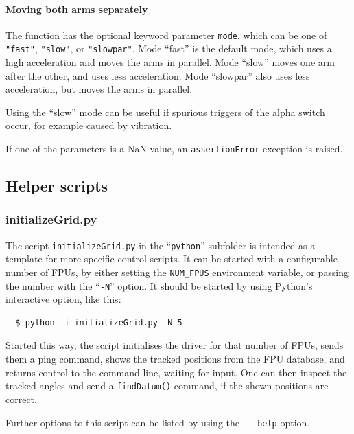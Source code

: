 \documentclass[11pt,a4paper]{scrartcl}
\begin{document}
\paragraph{Moving both arms separately}

The function has the optional keyword parameter \texttt{mode}, which
can be one of \texttt{"fast"}, \texttt{"slow"}, or \texttt{"slowpar"}.
Mode ``fast'' is the default mode, which uses a high acceleration and
moves the arms in parallel. Mode ``slow'' moves one arm after the
other, and uses less acceleration. Mode ``slowpar'' also uses less
acceleration, but moves the arms in parallel.

Using the ``slow'' mode can be useful if spurious triggers of the
alpha switch occur, for example caused by vibration.

If one of the parameters is a NaN value, an \texttt{assertionError}
exception is raised.

\subsection{Helper scripts}

\subsubsection{initializeGrid.py}
\label{sec:initializegrid}

The script \texttt{initializeGrid.py} in the ``\texttt{python}''
subfolder is intended as a template for more specific control scripts.
It can be started with a configurable number of FPUs, by either
setting the \texttt{NUM\_FPUS} environment variable, or passing the
number with the ``\texttt{-N}'' option. It should be started by using
Python's interactive option, like this:

\begin{verbatim}
  $ python -i initializeGrid.py -N 5
\end{verbatim}

Started this way, the script initialises the driver for that number of
FPUs, sends them a ping command, shows the tracked positions from the
FPU database, and returns control to the command line, waiting for
input. One can then inspect the tracked angles and send a
\texttt{findDatum()} command, if the shown positions are correct.

Further options to this script can be listed by using the
\texttt{-\,-help} option.
\end{document}
